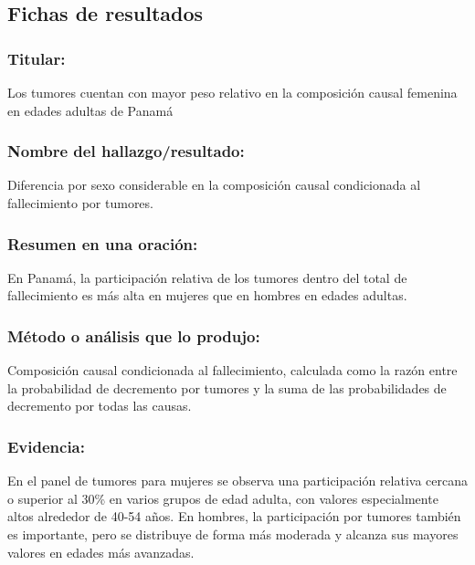\documentclass[
  spanish,
  letterpaper,
  DIV=11,
  numbers=noendperiod]{scrartcl}
\begin{document}
\subsection{Fichas de resultados}\label{fichas-de-resultados}

\subsubsection{Titular:}\label{titular-2}

Los tumores cuentan con mayor peso relativo en la composición causal
femenina en edades adultas de Panamá

\subsubsection{Nombre del
hallazgo/resultado:}\label{nombre-del-hallazgoresultado-2}

Diferencia por sexo considerable en la composición causal condicionada
al fallecimiento por tumores.

\subsubsection{Resumen en una
oración:}\label{resumen-en-una-oraciuxf3n-2}

En Panamá, la participación relativa de los tumores dentro del total de
fallecimiento es más alta en mujeres que en hombres en edades adultas.

\subsubsection{Método o análisis que lo
produjo:}\label{muxe9todo-o-anuxe1lisis-que-lo-produjo-2}

Composición causal condicionada al fallecimiento, calculada como la
razón entre la probabilidad de decremento por tumores y la suma de las
probabilidades de decremento por todas las causas.

\subsubsection{Evidencia:}\label{evidencia-2}

En el panel de tumores para mujeres se observa una participación
relativa cercana o superior al 30\% en varios grupos de edad adulta, con
valores especialmente altos alrededor de 40-54 años. En hombres, la
participación por tumores también es importante, pero se distribuye de
forma más moderada y alcanza sus mayores valores en edades más
avanzadas.
\end{document}
